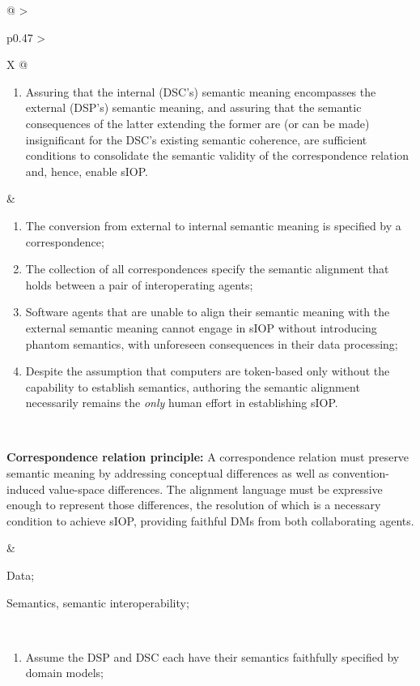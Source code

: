 \begin{xltabular}[l]{\linewidth}{@{} >{\small\raggedright\arraybackslash}p{0.47\linewidth} >{\small\raggedright\arraybackslash}X @{}}
\begin{enumerate}[left=6pt, nosep]
  \item Assuring that the internal (DSC's) semantic meaning encompasses the external (DSP's) semantic meaning, and assuring that the semantic consequences of the latter extending the former are (or can be made) insignificant for the DSC's existing semantic coherence, are sufficient conditions to consolidate the semantic validity of the correspondence relation and, hence, enable sIOP.
\end{enumerate}
&
\begin{enumerate}[left=10pt, nosep]
  \item The conversion from external to internal semantic meaning is specified by a correspondence;
  \item The collection of all correspondences specify the semantic alignment that holds between a pair of interoperating agents;
  \item Software agents that are unable to align their semantic meaning with the external semantic meaning cannot engage in sIOP without introducing phantom semantics, with unforeseen consequences in their data processing;
  \item Despite the assumption that computers are token-based only without the capability to establish semantics, authoring the semantic alignment necessarily remains the \emph{only} human effort in establishing sIOP.
\end{enumerate} \\
%
%
%
\begin{mmdp}\label{dp:alignment-language}{\bfseries Correspondence relation principle:}
\quad A correspondence relation must preserve semantic meaning by addressing conceptual differences as well as convention-induced value-space differences. The alignment language must be expressive enough to represent those differences, the resolution of which is a necessary condition to achieve sIOP, providing faithful DMs from both collaborating agents. \end{mmdp}
&
\begin{description}[labelwidth=3.7cm,leftmargin=3.7cm+1ex,nosep,topsep=2ex,labelsep=1ex,font=\bfseries]
  \item[Type of information:] Data;
  \item[Quality attributes:] Semantics, semantic interoperability;
\end{description}\\
\begin{enumerate}[left=6pt, nosep]
  \item Assume the DSP and DSC each have their semantics faithfully specified by domain models;

\end{enumerate}
\end{xltabular}
